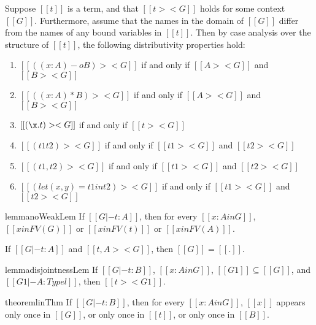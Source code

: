 \begin{lemma}
  \label{lemma:distributivity_of_disjointness}
  Suppose $[[t]]$ is a term, and that $[[t >< G]]$
  holds for some context $[[G]]$.  Furthermore, assume that the names
  in the domain of $[[G]]$ differ from the names of any bound
  variables in $[[t]]$.  Then by case analysis over the structure of
  $[[t]]$, the following distributivity properties hold:
  \begin{enumerate}[label=\roman*.]
  \item $[[((x : A) -o B) >< G]]$ if and only if $[[A >< G]]$ and $[[B >< G]]$
  \item $[[((x : A) * B) >< G]]$ if and only if $[[A >< G]]$ and $[[B >< G]]$  
  \item $[[(\x.t) >< G]]$ if and only if $[[t >< G]]$
  \item $[[(t1 t2) >< G]]$ if and only if $[[t1 >< G]]$ and $[[t2 >< G]]$
  \item $[[(t1,t2) >< G]]$ if and only if $[[t1 >< G]]$ and $[[t2 >< G]]$
  \item $[[(let (x,y) = t1 in t2) >< G]]$ if and only if $[[t1 >< G]]$ and $[[t2 >< G]]$
  \end{enumerate}
\end{lemma}

\begin{restatable}{lemma}{noWeakLem}
  \label{lemma:no_weakening}
  If $[[G |- t : A]]$, then for every
  $[[x : A in G]]$, $[[x in FV(G)]]$ or $[[x in FV(t)]]$ or $[[x in FV(A)]]$.  
\end{restatable}

\begin{lemma}
  \label{lemma:disjoint-contra}
  If $[[G |- t : A]]$ and $[[{t,A} >< G]]$, then $[[G]] = [[.]]$.
\end{lemma}

\begin{restatable}[Disjointness]{lemma}{disjointnessLem}
  \label{lemma:disjointness}
  If $[[G |- t : B]]$, $[[x : A in G]]$, $[[G1]] \subseteq [[G]]$, and $[[G1 |- A : Type l]]$, then
  $[[t >< G1]]$.
\end{restatable}

\begin{restatable}[Linearity]{theorem}{linThm}
  \label{thm:linearity}
  If $[[G |- t : B]]$, then for every $[[x : A in G]]$, $[[x]]$ appears only once in
  $[[G]]$, or only once in $[[t]]$, or only once in $[[B]]$.
\end{restatable}

